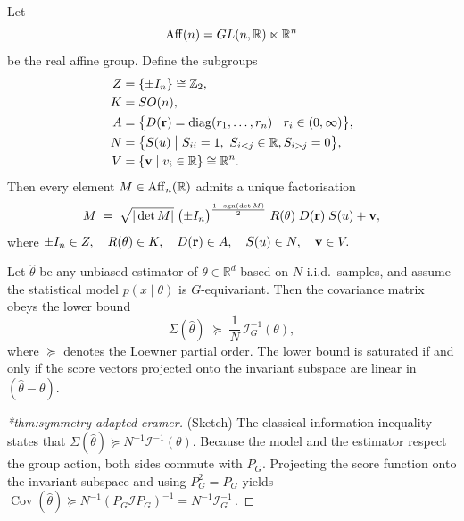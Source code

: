 \begin{theorem}
\noproofref
\noproofref

Let 
\[
    \operatorname{Aff}(n)= GL(n, \mathbb{R})\ltimes\mathbb{R}^n
\]
be the real affine group.  Define the subgroups
\[
\begin{aligned}
Z &= \{\pm I_n\}\cong \mathbb{Z}_2,\\
K &= SO(n),\\
A &= \bigl\{D(\vb r)=\operatorname{diag}(r_1,\dots,r_n)\;\big|\;r_i\in(0,\infty)\bigr\},\\
N &= \bigl\{S(u) \;\big|\;S_{ii}=1,\ S_{i < j}\in\mathbb{R}, S_{i>j}=0\bigr\},\\
V &= \qty{\vb v \mid v_i\in\mathbb{R}}\cong\mathbb{R}^n.
\end{aligned}
\]
Then every element $M\in\operatorname{Aff}_n(\mathbb{R})$ admits a unique factorisation
\[
M \;=\;
\sqrt{|\det M|}\;\bigl(\pm I_n\bigr)^{\frac{1-\text{sgn}(\det M)}{2}}
\;R(\vb\theta)\;D(\vb r)\;S(u) + \vb v,
\]
where
\(
\pm I_n\in Z,\quad R(\vb\theta)\in K,\quad D(\vb r)\in A,\quad S(u)\in N,\quad \vb v\in V.
\)
\end{theorem}

\begin{theorem}
\noproofref

    Let \(\hat\theta\) be any unbiased estimator of \(\theta\in\mathbb R^d\) based on \(N\) i.i.d.\ samples, and assume the statistical model \(p(x\mid\theta)\) is \(G\)-equivariant.
Then the covariance matrix obeys the lower bound
\[
  \Sigma(\hat\theta)
  \;\succeq\;
  \frac{1}{N}\,\mathcal I_G^{-1}(\theta),
\]
where \(\succeq\) denotes the Loewner partial order.  The lower bound is saturated if and only if the score vectors projected onto the invariant subspace are linear in \((\hat\theta-\theta)\).
\end{theorem}

\begin{proof}[*thm:symmetry-adapted-cramer]
(Sketch) The classical information inequality states that
\(\Sigma(\hat\theta)\succeq N^{-1}\mathcal I^{-1}(\theta)\).
Because the model and the estimator respect the group action, both sides commute with \(P_G\).  
Projecting the score function onto the invariant subspace and using \(P_G^2=P_G\) yields  
\(\operatorname{Cov}(\hat\theta)\succeq N^{-1}(P_G\mathcal I P_G)^{-1}=N^{-1}\mathcal I_G^{-1}\,\).
\end{proof}

